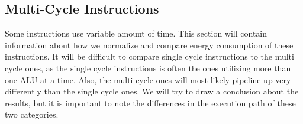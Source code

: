 \subsection{Multi-Cycle Instructions}
Some instructions use variable amount of time. This section will contain
information about how we normalize and compare energy consumption of
these instructions. It will be difficult to compare single cycle instructions
to the multi cycle ones, as the single cycle instructions is often the ones
utilizing more than one ALU at a time. Also, the multi-cycle ones will most
likely pipeline up very differently than the single cycle ones. We will try to
draw a conclusion about the results, but it is important to note the differences
in the execution path of these two categories.
